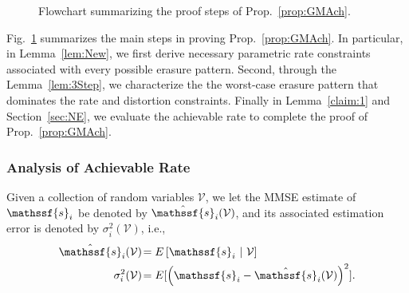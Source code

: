 \documentclass[journal, twocolumn, 10pt]{IEEEtran}
\newcommand{\rvs}{{\mathssf{s}}}    %
\newcommand{\rvu}{{\mathssf{u}}}    %
\begin{document}
\begin{figure}
\begin{center}
\begin{tikzpicture}
%
%
%
%
%
\end{tikzpicture}
\caption{Flowchart summarizing the  proof steps of Prop.~\ref{prop:GMAch}.}
\label{fig:Chart}
\end{center}
\end{figure}

Fig.~\ref{fig:Chart} summarizes the main steps in proving Prop.~\ref{prop:GMAch}. In particular, in Lemma~\ref{lem:New}, we first derive necessary parametric  rate constraints associated with every possible erasure pattern. Second, through the Lemma~\ref{lem:3Step}, we characterize the  the worst-case erasure pattern that dominates the rate and distortion constraints.  Finally in Lemma~\ref{claim:1} and Section~\ref{sec:NE}, we evaluate the achievable rate to complete the proof of Prop.~\ref{prop:GMAch}.



\subsubsection{Analysis of Achievable Rate}
Given a collection of random variables ${\mathcal V}$, we let the MMSE estimate of $\rvs_i$ be denoted by $\hat{\rvs}_{i}({\mathcal V})$, and its associated estimation error is denoted by $\sigma^2_{i}({\mathcal V})$, i.e.,
\begin{align}
\hat{\rvs}_{i}({\mathcal V}) &\!= E\left[ \rvs_{i}~|~{\mathcal V} \right]\label{eq:s_est-def}\\
\sigma^2_{i}({\mathcal V}) &\!= E[\left(\rvs_{i} -\hat{\rvs}_{i}({\mathcal V})\right)^2] \label{eq:sig-def}.
\end{align}    
\end{document}
